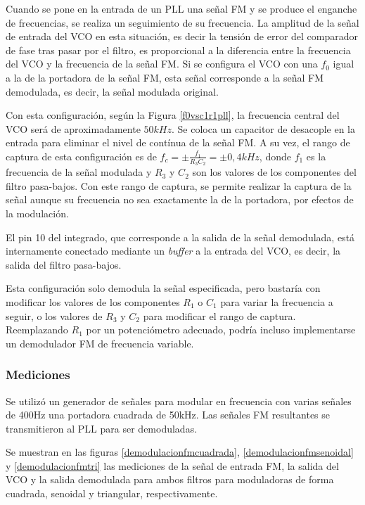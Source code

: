 Cuando se pone en la entrada de un PLL una señal FM y se produce el enganche de frecuencias, se realiza un seguimiento de su frecuencia. La amplitud de la señal de entrada del VCO en esta situación, es decir la tensión de error del comparador de fase tras pasar por el filtro, es proporcional a la diferencia entre la frecuencia del VCO y la frecuencia de la señal FM. Si se configura el VCO con una $f_{0}$ igual a la de la portadora de la señal FM, esta señal corresponde a la señal FM demodulada, es decir, la señal modulada original.

Con esta configuración, según la Figura \ref{f0vsc1r1pll}, la frecuencia central del VCO será de aproximadamente $50kHz$. Se coloca un capacitor de desacople en la entrada para eliminar el nivel de contínua de la señal FM. A su vez, el rango de captura de esta configuración es de $f_{c}=\pm \frac{f_{1}}{R_{3}C_{2}}=\pm0,4kHz$, donde $f_{1}$ es la frecuencia de la señal modulada y  $R_{3}$ y $C_{2}$ son los valores de los componentes del filtro pasa-bajos. Con este rango de captura, se permite realizar la captura de la señal aunque su frecuencia no sea exactamente la de la portadora, por efectos de la modulación.

El pin 10 del integrado, que corresponde a la salida de la señal demodulada, está internamente conectado mediante un \emph{buffer} a la entrada del VCO, es decir, la salida del filtro pasa-bajos.

Esta configuración solo demodula la señal especificada, pero bastaría con modificar los valores de los componentes $R_{1}$ o $C_{1}$ para variar la frecuencia a seguir, o los valores de $R_{3}$ y $C_{2}$ para modificar el rango de captura. Reemplazando $R_{1}$ por un potenciómetro adecuado, podría incluso implementarse un demodulador FM de frecuencia variable.

\subsubsection{Mediciones}
Se utilizó un generador de señales para modular en frecuencia con varias señales de 400Hz una portadora cuadrada de 50kHz. Las señales FM resultantes se transmitieron al PLL para ser demoduladas.


Se muestran en las figuras \ref{demodulacionfmcuadrada}, \ref{demodulacionfmsenoidal} y \ref{demodulacionfmtri} las mediciones de la señal de entrada FM, la salida del VCO y la salida demodulada para ambos filtros para moduladoras de forma cuadrada, senoidal y triangular, respectivamente. 

